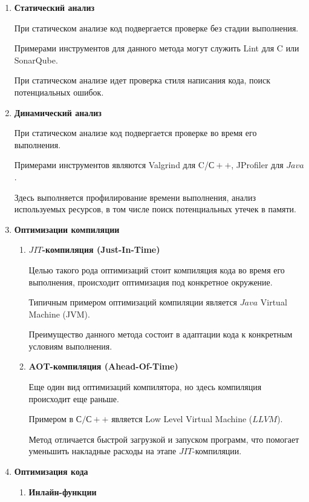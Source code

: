 \documentclass{mipt-thesis-bs}
\begin{document}
\begin{enumerate}
\item \textbf{Статический анализ}

При статическом анализе код подвергается проверке без стадии выполнения.

Примерами инструментов для данного метода могут служить Lint для C или SonarQube.

При статическом анализе идет проверка стиля написания кода, поиск потенциальных ошибок.

\item \textbf{Динамический анализ}

При статическом анализе код подвергается проверке во время его выполнения.

Примерами инструментов являются Valgrind для C/$С++$, JProfiler для $Java$.

Здесь выполняется профилирование времени выполнения, анализ используемых ресурсов, в том числе
поиск потенциальных утечек в памяти.

\item \textbf{Оптимизации компиляции}
    \begin{enumerate}
        \item \textbf{$JIT$-компиляция (Just-In-Time)}

        Целью такого рода оптимизаций стоит компиляция кода во время его выполнения, происходит
        оптимизация под конкретное окружение.

        Типичным примером оптимизаций компиляции является $Java$ Virtual Machine (JVM).

        Преимущество данного метода состоит в адаптации кода к конкретным условиям выполнения.

        \item \textbf{AOT-компиляция (Ahead-Of-Time)}

        Еще один вид оптимизаций компилятора, но здесь компиляция происходит еще раньше.

        Примером в $С/С++$ является Low Level Virtual Machine ($LLVM$).

        Метод отличается быстрой загрузкой и запуском программ, что помогает уменьшить накладные
        расходы на этапе $JIT$-компиляции.
    \end{enumerate}

\item \textbf{Оптимизация кода}
    \begin{enumerate}
        \item \textbf{Инлайн-функции}


\end{enumerate}
\end{enumerate}
\end{document}

